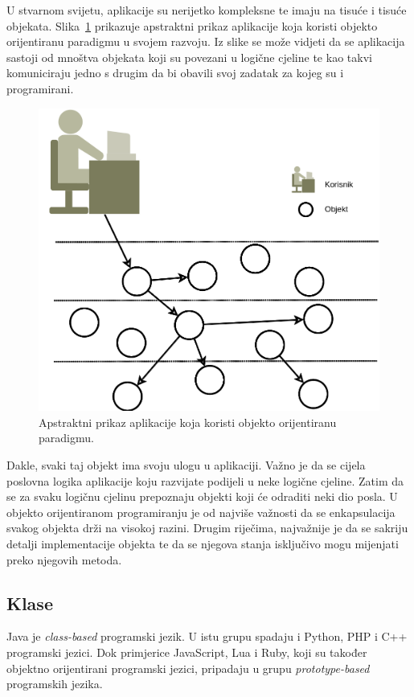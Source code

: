 U stvarnom svijetu, aplikacije su nerijetko kompleksne te imaju na tisuće i tisuće objekata. Slika~\ref{fig:oop_system_abstract_overview} prikazuje apstraktni prikaz aplikacije koja koristi objekto orijentiranu paradigmu u svojem razvoju. Iz slike se može vidjeti da se aplikacija sastoji od mnoštva objekata koji su povezani u logične cjeline te kao takvi komuniciraju jedno s drugim da bi obavili svoj zadatak za kojeg su i programirani.

\begin{figure}[h!]
    \caption{Apstraktni prikaz aplikacije koja koristi objekto orijentiranu paradigmu.}
    \label{fig:oop_system_abstract_overview}
    \centering
    \includegraphics[max width=\textwidth]{images/oop_system_abstract_overview.png}
\end{figure}

Dakle, svaki taj objekt ima svoju ulogu u aplikaciji. Važno je da se cijela poslovna logika aplikacije koju razvijate podijeli u neke logične cjeline. Zatim da se za svaku logičnu cjelinu prepoznaju objekti koji će odraditi neki dio posla. U objekto orijentiranom programiranju je od najviše važnosti da se enkapsulacija svakog objekta drži na visokoj razini. Drugim riječima, najvažnije je da se sakriju detalji implementacije objekta te da se njegova stanja isključivo mogu mijenjati preko njegovih metoda.

\subsection{Klase}
Java je \emph{class-based} \cite{classbasedprogramming} programski jezik. U istu grupu spadaju i Python, PHP i C++ programski jezici. Dok primjerice JavaScript, Lua i Ruby, koji su također objektno orijentirani programski jezici, pripadaju u grupu \emph{prototype-based} \cite{prototypebasedprogramming} programskih jezika.

